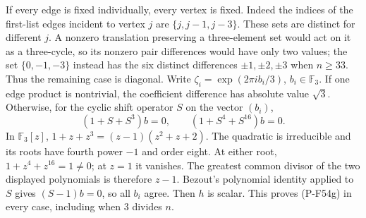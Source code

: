 \documentclass[11pt,a4paper]{article}
\begin{document}
If every edge is fixed individually, every vertex is fixed.
Indeed the indices of the first-list edges incident to vertex
$j$ are $\{j,j-1,j-3\}$. These sets are distinct for different
$j$. A nonzero translation preserving a three-element set
would act on it as a three-cycle, so its nonzero pair
differences would have only two values; the set
$\{0,-1,-3\}$ instead has the six distinct differences
$\pm1,\pm2,\pm3$ when $n\ge33$.
Thus the remaining case is diagonal. Write
$\zeta_i=\exp(2\pi i b_i/3)$, $b_i\in\mathbb F_3$.
If one edge product is nontrivial, the coefficient difference
has absolute value $\sqrt3$. Otherwise, for the cyclic shift
operator $S$ on the vector $(b_i)$,
\[
       (1+S+S^3)b=0,
       \qquad(1+S^4+S^{16})b=0.                              \tag{P-F54h}
\]
In $\mathbb F_3[z]$,
$1+z+z^3=(z-1)(z^2+z+2)$.
The quadratic is irreducible and its roots have fourth
power $-1$ and order eight. At either root,
$1+z^4+z^{16}=1\ne0$; at $z=1$ it vanishes.
The greatest common divisor of the two displayed polynomials
is therefore $z-1$. Bezout's polynomial identity applied to
$S$ gives $(S-1)b=0$, so all $b_i$ agree.
Then $h$ is scalar. This proves (P-F54g) in every case,
including when $3$ divides $n$.
\end{document}
